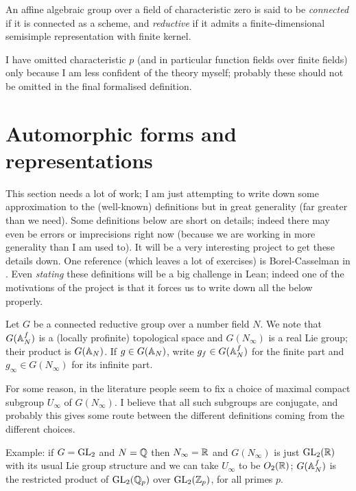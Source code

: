 \begin{definition}\label{connected_reductive_group} An affine algebraic group over a field of characteristic zero is said to be \emph{connected} if it is connected as a scheme, and \emph{reductive} if it admits a finite-dimensional semisimple representation with finite kernel.
\end{definition}

\begin{remark} I have omitted characteristic $p$ (and in particular function fields over finite fields) only because I am less confident of the theory myself; probably these should not be omitted in the final formalised definition.
\end{remark}

\section{Automorphic forms and representations}

This section needs a lot of work; I am just attempting to write down some approximation to the (well-known) definitions but in great generality (far greater than we need). Some definitions below are short on details; indeed there may even be errors or imprecisions right now (because we are working in more generality than I am used to). It will be a very interesting project to get these details down. One reference (which leaves a lot of exercises) is Borel-Casselman in \cite{corvallis1}. Even \emph{stating} these definitions will be a big challenge in Lean; indeed one of the motivations of the project is that it forces us to write down all the below properly.

Let $G$ be a connected reductive group over a number field $N$.  We note
that $G(\mathbb{A}_N^f)$ is a (locally profinite) topological space and $G(N_\infty)$ is a real Lie group;
their product is $G(\mathbb{A}_N)$. If $g\in G(\mathbb{A}_N)$, write $g_f\in G(\mathbb{A}_N^f)$ for the finite part and $g_\infty\in G(N_\infty)$ for its infinite part.

For some reason, in the literature people seem to fix a choice of maximal compact subgroup $U_\infty$ of $G(N_\infty)$. I believe that all such subgroups are conjugate, and probably this gives some route between the different definitions coming from the different choices.

Example: if $G=\operatorname{GL}_2$ and $N=\mathbb{Q}$ then $N_\infty=\mathbb{R}$ and $G(N_\infty)$ is just $\operatorname{GL}_2(\mathbb{R})$ with its usual Lie group structure and we can take $U_\infty$ to be $O_2(\mathbb{R})$; $G(\mathbb{A}_N^f)$ is the restricted product of $\operatorname{GL}_2(\mathbb{Q}_p)$ over $\operatorname{GL}_2(\mathbb{Z}_p)$, for all primes $p$.

